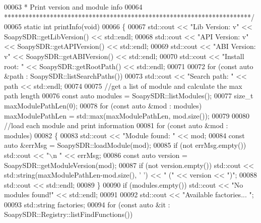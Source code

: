 \begin{DoxyCode}
00063 \textcolor{comment}{ * Print version and module info}
00064 \textcolor{comment}{ **********************************************************************/}
00065 \textcolor{keyword}{static} \textcolor{keywordtype}{int} printInfo(\textcolor{keywordtype}{void})
00066 \{
00067     std::cout << \textcolor{stringliteral}{"Lib Version: v"} << SoapySDR::getLibVersion() << std::endl;
00068     std::cout << \textcolor{stringliteral}{"API Version: v"} << SoapySDR::getAPIVersion() << std::endl;
00069     std::cout << \textcolor{stringliteral}{"ABI Version: v"} << SoapySDR::getABIVersion() << std::endl;
00070     std::cout << \textcolor{stringliteral}{"Install root: "} << SoapySDR::getRootPath() << std::endl;
00071 
00072     \textcolor{keywordflow}{for} (\textcolor{keyword}{const} \textcolor{keyword}{auto} &path : SoapySDR::listSearchPaths())
00073         std::cout << \textcolor{stringliteral}{"Search path: "} << path << std::endl;
00074 
00075     \textcolor{comment}{//get a list of module and calculate the max path length}
00076     \textcolor{keyword}{const} \textcolor{keyword}{auto} modules = SoapySDR::listModules();
00077     \textcolor{keywordtype}{size\_t} maxModulePathLen(0);
00078     \textcolor{keywordflow}{for} (\textcolor{keyword}{const} \textcolor{keyword}{auto} &mod : modules) maxModulePathLen = std::max(maxModulePathLen, mod.size());
00079 
00080     \textcolor{comment}{//load each module and print information}
00081     \textcolor{keywordflow}{for} (\textcolor{keyword}{const} \textcolor{keyword}{auto} &mod : modules)
00082     \{
00083         std::cout << \textcolor{stringliteral}{"Module found: "} << mod;
00084         \textcolor{keyword}{const} \textcolor{keyword}{auto} &errMsg = SoapySDR::loadModule(mod);
00085         \textcolor{keywordflow}{if} (not errMsg.empty()) std::cout << \textcolor{stringliteral}{"\(\backslash\)n  "} << errMsg;
00086         \textcolor{keyword}{const} \textcolor{keyword}{auto} version = SoapySDR::getModuleVersion(mod);
00087         \textcolor{keywordflow}{if} (not version.empty()) std::cout << std::string(maxModulePathLen-mod.size(), \textcolor{charliteral}{' '}) << \textcolor{stringliteral}{" ("} << 
      version << \textcolor{stringliteral}{")"};
00088         std::cout << std::endl;
00089     \}
00090     \textcolor{keywordflow}{if} (modules.empty()) std::cout << \textcolor{stringliteral}{"No modules found!"} << std::endl;
00091 
00092     std::cout << \textcolor{stringliteral}{"Available factories... "};
00093     std::string factories;
00094     \textcolor{keywordflow}{for} (\textcolor{keyword}{const} \textcolor{keyword}{auto} &it : SoapySDR::Registry::listFindFunctions())

\end{DoxyCode}
